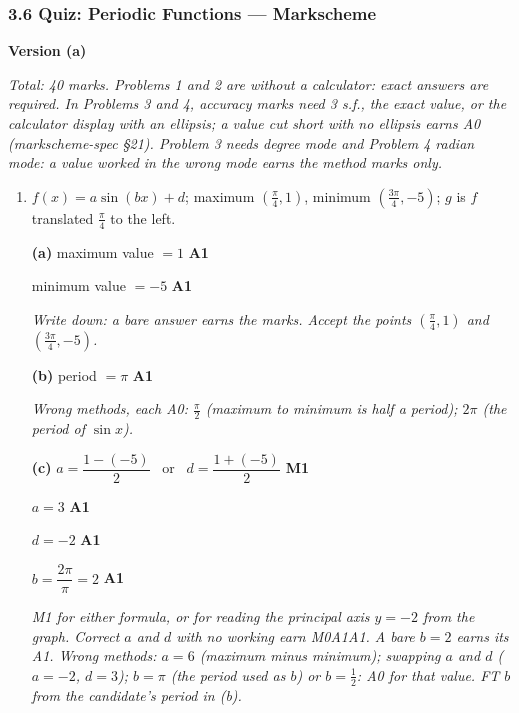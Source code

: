 \documentclass[12pt, twoside]{article}
\begin{document}
\subsubsection*{3.6 Quiz: Periodic Functions --- Markscheme}

\textbf{\large Version (a)}

\emph{Total: 40 marks. Problems 1 and 2 are without a calculator: exact
answers are required. In Problems 3 and 4, accuracy marks need 3 s.f., the
exact value, or the calculator display with an ellipsis; a value cut short
with no ellipsis earns A0 (markscheme-spec \S21). Problem 3 needs degree
mode and Problem 4 radian mode: a value worked in the wrong mode earns the
method marks only.}

\begin{enumerate}[itemsep=0.3cm]

\item[1.] [Maximum mark: 9]

$f(x) = a\sin(bx) + d$; maximum $\left(\frac{\pi}{4}, 1\right)$, minimum
$\left(\frac{3\pi}{4}, -5\right)$; $g$ is $f$ translated $\frac{\pi}{4}$ to
the left.

\textbf{(a)} maximum value $= 1$ \hfill \textbf{A1}

minimum value $= -5$ \hfill \textbf{A1}

\emph{Write down: a bare answer earns the marks. Accept the points
$\left(\frac{\pi}{4}, 1\right)$ and $\left(\frac{3\pi}{4}, -5\right)$.}

\textbf{(b)} period $= \pi$ \hfill \textbf{A1}

\emph{Wrong methods, each A0: $\frac{\pi}{2}$ (maximum to minimum is half a
period); $2\pi$ (the period of $\sin x$).}

\textbf{(c)} $a = \dfrac{1 - (-5)}{2}$ \ or \ $d = \dfrac{1 + (-5)}{2}$
\hfill \textbf{M1}

$a = 3$ \hfill \textbf{A1}

$d = -2$ \hfill \textbf{A1}

$b = \dfrac{2\pi}{\pi} = 2$ \hfill \textbf{A1}

\emph{M1 for either formula, or for reading the principal axis $y = -2$
from the graph. Correct $a$ and $d$ with no working earn M0A1A1. A bare
$b = 2$ earns its A1. Wrong methods: $a = 6$ (maximum minus minimum);
swapping $a$ and $d$ ($a = -2$, $d = 3$); $b = \pi$ (the period used as
$b$) or $b = \frac{1}{2}$: A0 for that value. FT $b$ from the candidate's
period in (b).}


\end{enumerate}
\end{document}
